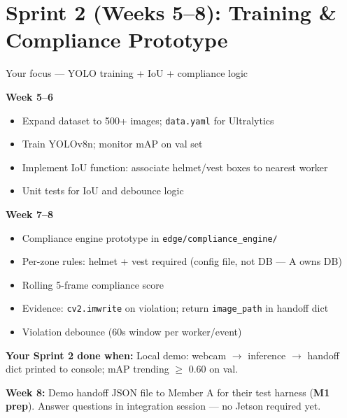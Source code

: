 \documentclass[12pt,a4paper]{article}
\begin{document}
\section{Sprint 2 (Weeks 5--8): Training \& Compliance Prototype}

\begin{sprintbox}{Your focus --- YOLO training + IoU + compliance logic}

\begin{taskbox}
\textbf{Week 5--6}
\begin{itemize}
    \item Expand dataset to 500+ images; \texttt{data.yaml} for Ultralytics
    \item Train YOLOv8n; monitor mAP on val set
    \item Implement IoU function: associate helmet/vest boxes to nearest worker
    \item Unit tests for IoU and debounce logic
\end{itemize}
\end{taskbox}

\begin{taskbox}
\textbf{Week 7--8}
\begin{itemize}
    \item Compliance engine prototype in \texttt{edge/compliance\_engine/}
    \item Per-zone rules: helmet + vest required (config file, not DB --- A owns DB)
    \item Rolling 5-frame compliance score
    \item Evidence: \texttt{cv2.imwrite} on violation; return \texttt{image\_path} in handoff dict
    \item Violation debounce (60s window per worker/event)
\end{itemize}
\end{taskbox}

\begin{deliverablebox}
\textbf{Your Sprint 2 done when:} Local demo: webcam $\rightarrow$ inference $\rightarrow$ handoff dict printed to console; mAP trending $\geq$ 0.60 on val.
\end{deliverablebox}

\begin{collabbox}
\textbf{Week 8:} Demo handoff JSON file to Member A for their test harness (\textbf{M1 prep}). Answer questions in integration session --- no Jetson required yet.
\end{collabbox}

\end{sprintbox}
\end{document}
